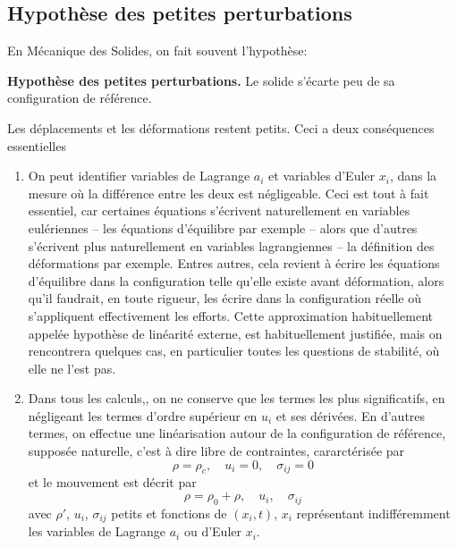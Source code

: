 \subsection{Hypothèse des petites perturbations} \label{ssec:Ch03-2.1}
En Mécanique des Solides, on fait souvent l'hypothèse:
\par\noindent\textbf{Hypothèse des petites perturbations.} Le solide s'écarte peu de sa configuration de référence.

Les déplacements et les déformations restent petits. 
Ceci a deux conséquences essentielles 
\begin{enumerate}
    \item On peut identifier variables de Lagrange $a_i$ et variables d'Euler $x_i$, dans la mesure où la différence entre les deux est négligeable.
        Ceci est tout à fait essentiel, car certaines équations s'écrivent naturellement en variables eulériennes -- les équations d'équilibre par exemple -- alors que d'autres s'écrivent plus naturellement en variables lagrangiennes -- la définition des déformations par exemple.
        Entres autres, cela revient à écrire les équations d'équilibre dans la configuration telle qu'elle existe avant déformation, alors qu'il faudrait, en toute rigueur, les écrire dans la configuration réelle où s'appliquent effectivement les efforts.
        Cette approximation habituellement appelée hypothèse de linéarité externe, est habituellement justifiée, mais on rencontrera quelques cas, en particulier toutes les questions de stabilité, où elle ne l'est pas.
    \item Dans tous les calculs,, on ne conserve que les termes les plus significatifs, en négligeant les termes d'ordre supérieur en $u_i$ et ses dérivées.
        En d'autres termes, on effectue une linéarisation autour de la configuration de référence, supposée naturelle, c'est à dire libre de contraintes, cararctérisée par 
        \begin{equation}
            \rho = \rho_c, \quad u_i = 0, \quad \sigma_{ij} = 0
            \label{eq:Ch03-024}
        \end{equation}
        et le mouvement est décrit par
        \begin{equation}
            \rho = \rho_0 + \rho, \quad u_i, \quad \sigma_{ij}
            \label{eq:Ch03-025}
        \end{equation}
        avec $\rho'$, $u_i$, $\sigma_{ij}$ petits et fonctions de $\left( x_i,t \right)$, $x_i$ représentant indifféremment les variables de Lagrange $a_i$ ou d'Euler $x_i$.

\end{enumerate}

